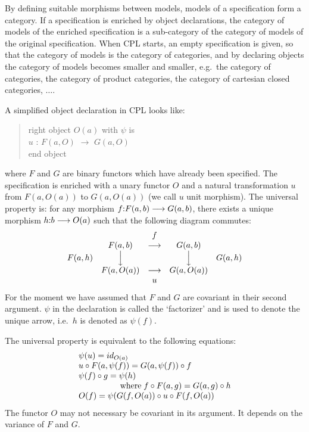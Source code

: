 By defining suitable morphisms between models, models of a specification
form a category.  If a specification is enriched by object declarations, the
category of models of the enriched specification is a sub-category of the
category of models of the original specification.  When CPL starts, an empty
specification is given, so that the category of models is the category of
categories, and by declaring objects the category of models becomes smaller
and smaller, e.g.\ the category of categories, the category of
product categories, the category of cartesian closed categories, $\ldots$.

A simplified object declaration in CPL looks like:
\begin{quote}
right object $O(a)$ with $\psi$ is \\
\makebox[2em]{} $u$ : $F(a,O)$ $\longrightarrow$ $G(a,O)$ \\
end object \\
\end{quote}
where $F$ and $G$ are binary functors which have already been specified.
The specification is enriched with a unary functor $O$ and a natural
transformation $u$ from $F(a,O(a))$ to $G(a,O(a))$ (we call $u$ unit
morphism).  The universal property is: for any morphism $f{\rm
:}F(a,b)\longrightarrow G(a,b)$, there exists a unique morphism $h {\rm :} b
 \longrightarrow O(a)$ such that the following diagram commutes:
\begin{displaymath}
\begin{array}{rcccl}
& & f & & \\
& F(a,b) & \longrightarrow & G(a,b) & \\
F(a,h) & {\Big\downarrow} & & {\Big\downarrow} & G(a,h) \\
& F(a,O(a)) & \longrightarrow & G(a,O(a)) & \\
& & u & & \\
\end{array}
\end{displaymath}
For the moment we have assumed that $F$ and $G$ are covariant in their second
argument.  $\psi$ in the declaration is called the `factorizer' and is used
to denote the unique arrow, i.e.\ $h$ is denoted as $\psi (f)$.

The universal property is equivalent to the following equations:
\begin{displaymath}
\begin{array}{l}
\psi (u) = id_{O(a)} \\
u\circ F(a,\psi (f)) = G(a,\psi (f))\circ f \\
\psi (f)\circ g = \psi (h) \\
\makebox[5em]{} {\rm where} \; f\circ F(a,g) = G(a,g)\circ h \\
O(f) = \psi (G(f,O(a))\circ u\circ F(f,O(a)) \\
\end{array}
\end{displaymath}
The functor $O$ may not necessary be covariant in its argument.  It depends
on the variance of $F$ and $G$.

